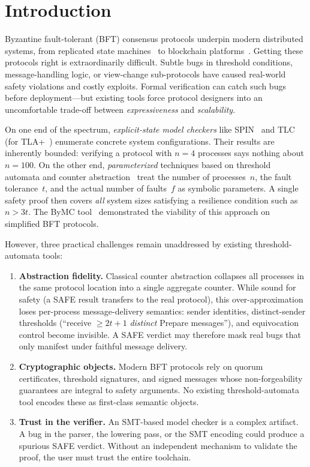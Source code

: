 \section{Introduction}\label{sec:intro}

Byzantine fault-tolerant (BFT) consensus protocols underpin modern
distributed systems, from replicated state machines~\cite{CastroLiskov1999}
to blockchain platforms~\cite{GiladHMVZ2017, YinMGRGA2019}.  Getting these
protocols right is extraordinarily difficult.  Subtle bugs in threshold
conditions, message-handling logic, or view-change sub-protocols have
caused real-world safety violations and costly exploits.  Formal
verification can catch such bugs before deployment---but existing tools
force protocol designers into an uncomfortable trade-off between
\emph{expressiveness} and \emph{scalability}.

On one end of the spectrum, \emph{explicit-state model checkers} like
SPIN~\cite{Holzmann2003} and TLC (for TLA+~\cite{LamportTLA2002})
enumerate concrete system configurations.  Their results are inherently
bounded: verifying a protocol with $n{=}4$ processes says nothing about
$n{=}100$.  On the other end, \emph{parameterized} techniques based on
threshold automata and counter
abstraction~\cite{KonnovVW2015, KonnovLVW2017} treat the number of
processes~$n$, the fault tolerance~$t$, and the actual number of
faults~$f$ as symbolic parameters.  A single safety proof then covers
\emph{all} system sizes satisfying a resilience condition such as
$n > 3t$.  The ByMC tool~\cite{KonnovWidder2018} demonstrated the
viability of this approach on simplified BFT protocols.

However, three practical challenges remain unaddressed by existing
threshold-automata tools:

\begin{enumerate}
\item \textbf{Abstraction fidelity.}
  Classical counter abstraction collapses all processes in the same
  protocol location into a single aggregate counter.  While sound for
  safety (a SAFE result transfers to the real protocol), this
  over-approximation loses per-process message-delivery semantics:
  sender identities, distinct-sender thresholds (``receive $\geq 2t{+}1$
  \emph{distinct} Prepare messages''), and equivocation control become
  invisible.  A SAFE verdict may therefore mask real bugs that only
  manifest under faithful message delivery.

\item \textbf{Cryptographic objects.}
  Modern BFT protocols rely on quorum certificates, threshold
  signatures, and signed messages whose non-forgeability guarantees are
  integral to safety arguments.  No existing threshold-automata tool
  encodes these as first-class semantic objects.

\item \textbf{Trust in the verifier.}
  An SMT-based model checker is a complex artifact.  A bug in the
  parser, the lowering pass, or the SMT encoding could produce a
  spurious SAFE verdict.  Without an independent mechanism to validate
  the proof, the user must trust the entire toolchain.
\end{enumerate}

